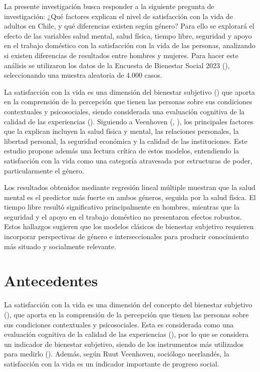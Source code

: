 \documentclass[
  spanish,
  a4paper,
  oneside]{scrbook}
\begin{document}
La presente investigación busca responder a la siguiente pregunta de
investigación: ¿Qué factores explican el nivel de satisfacción con la
vida de adultos en Chile, y qué diferencias existen según género? Para
ello se explorará el efecto de las variables salud mental, salud física,
tiempo libre, seguridad y apoyo en el trabajo doméstico con la
satisfacción con la vida de las personas, analizando si existen
diferencias de resultados entre hombres y mujeres. Para hacer este
análisis se utilizaron los datos de la Encuesta de Bienestar Social 2023
(), seleccionando una muestra aleatoria de 4.000 casos.

La satisfacción con la vida es una dimensión del bienestar subjetivo
() que aporta en la comprensión
de la percepción que tienen las personas sobre sus condiciones
contextuales y psicosociales, siendo considerada una evaluación
cognitiva de la calidad de las experiencias
(). Siguiendo a Veenhoven
(,
), los principales factores que la
explican incluyen la salud física y mental, las relaciones personales,
la libertad personal, la seguridad económica y la calidad de las
instituciones. Este estudio propone además una lectura crítica de estos
modelos, entendiendo la satisfacción con la vida como una categoría
atravesada por estructuras de poder, particularmente el género.

Los resultados obtenidos mediante regresión lineal múltiple muestran que
la salud mental es el predictor más fuerte en ambos géneros, seguida por
la salud física. El tiempo libre resultó significativo principalmente en
hombres, mientras que la seguridad y el apoyo en el trabajo doméstico no
presentaron efectos robustos. Estos hallazgos sugieren que los modelos
clásicos de bienestar subjetivo requieren incorporar perspectivas de
género e interseccionales para producir conocimiento más situado y
socialmente relevante.


\chapter{Antecedentes}\label{antecedentes}

La satisfacción con la vida es una dimensión del concepto del bienestar
subjetivo (), que aporta en la
comprensión de la percepción que tienen las personas sobre sus
condiciones contextuales y psicosociales. Esta es considerada como una
evaluación cognitiva de la calidad de las experiencias
(), por lo que se
considera un indicador de bienestar subjetivo, siendo de los
instrumentos más utilizados para medirlo
(). Además, según
Ruut Veenhoven, sociólogo neerlandés, la satisfacción con la vida es un
indicador importante de progreso social.
\end{document}
